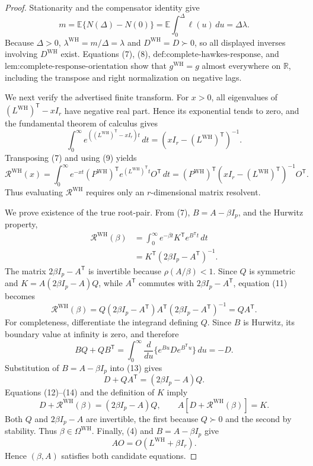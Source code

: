 \documentclass{article}
\begin{document}
\begin{proof}
Stationarity and the compensator identity give
\[
 m=\mathbb E\{N(\Delta)-N(0)\}
 =\mathbb E\int_0^\Delta\ell(u)\,du=\Delta\lambda.
\tag{8}
\]
Because \(\Delta>0\), \(\lambda^{\mathrm{WH}}=m/\Delta=\lambda\) and \(D^{\mathrm{WH}}=D\succ0\), so all displayed inverses involving \(D^{\mathrm{WH}}\) exist.  Equations (7), (8), \(\text{def:complete-hawkes-response}\), and \(\text{lem:complete-response-orientation}\) show that \(g^{\mathrm{WH}}=g\) almost everywhere on \(\mathbb R\), including the transpose and right normalization on negative lags.

We next verify the advertised finite transform.  For \(x>0\), all eigenvalues of \((L^{\mathrm{WH}})^{\mathsf T}-xI_r\) have negative real part.  Hence its exponential tends to zero, and the fundamental theorem of calculus gives
\[
 \int_0^\infty e^{((L^{\mathrm{WH}})^{\mathsf T}-xI_r)t}\,dt
 =(xI_r-(L^{\mathrm{WH}})^{\mathsf T})^{-1}.
\tag{9}
\]
Transposing (7) and using (9) yields
\[
 \mathcal R^{\mathrm{WH}}(x)
 =\int_0^\infty e^{-xt}(P^{\mathrm{WH}})^{\mathsf T}
 e^{(L^{\mathrm{WH}})^{\mathsf T}t}O^{\mathsf T}\,dt
 =(P^{\mathrm{WH}})^{\mathsf T}(xI_r-(L^{\mathrm{WH}})^{\mathsf T})^{-1}O^{\mathsf T}.
\tag{10}
\]
Thus evaluating \(\mathcal R^{\mathrm{WH}}\) requires only an \(r\)-dimensional matrix resolvent.

We prove existence of the true root-pair.  From (7), \(B=A-\beta I_p\), and the Hurwitz property,
\[
 \begin{aligned}
 \mathcal R^{\mathrm{WH}}(\beta)
 &=\int_0^\infty e^{-\beta t}K^{\mathsf T}e^{B^{\mathsf T}t}\,dt\\
 &=K^{\mathsf T}(2\beta I_p-A^{\mathsf T})^{-1}.
 \end{aligned}
\tag{11}
\]
The matrix \(2\beta I_p-A^{\mathsf T}\) is invertible because \(\rho(A/\beta)<1\).  Since \(Q\) is symmetric and \(K=A(2\beta I_p-A)Q\), while \(A^{\mathsf T}\) commutes with \(2\beta I_p-A^{\mathsf T}\), equation (11) becomes
\[
 \mathcal R^{\mathrm{WH}}(\beta)
 =Q(2\beta I_p-A^{\mathsf T})A^{\mathsf T}
   (2\beta I_p-A^{\mathsf T})^{-1}=QA^{\mathsf T}.
\tag{12}
\]
For completeness, differentiate the integrand defining \(Q\).  Since \(B\) is Hurwitz, its boundary value at infinity is zero, and therefore
\[
 BQ+QB^{\mathsf T}
 =\int_0^\infty\frac{d}{du}
   \{e^{Bu}De^{B^{\mathsf T}u}\}\,du=-D.
\tag{13}
\]
Substitution of \(B=A-\beta I_p\) into (13) gives
\[
 D+QA^{\mathsf T}=(2\beta I_p-A)Q.
\tag{14}
\]
Equations (12)--(14) and the definition of \(K\) imply
\[
 D+\mathcal R^{\mathrm{WH}}(\beta)=(2\beta I_p-A)Q,\qquad
 A[D+\mathcal R^{\mathrm{WH}}(\beta)]=K.
\tag{15}
\]
Both \(Q\) and \(2\beta I_p-A\) are invertible, the first because \(Q\succ0\) and the second by stability.  Thus \(\beta\in\Omega^{\mathrm{WH}}\).  Finally, (4) and \(B=A-\beta I_p\) give
\[
 AO=O(L^{\mathrm{WH}}+\beta I_r).
\tag{16}
\]
Hence \((\beta,A)\) satisfies both candidate equations.


\end{proof}
\end{document}
